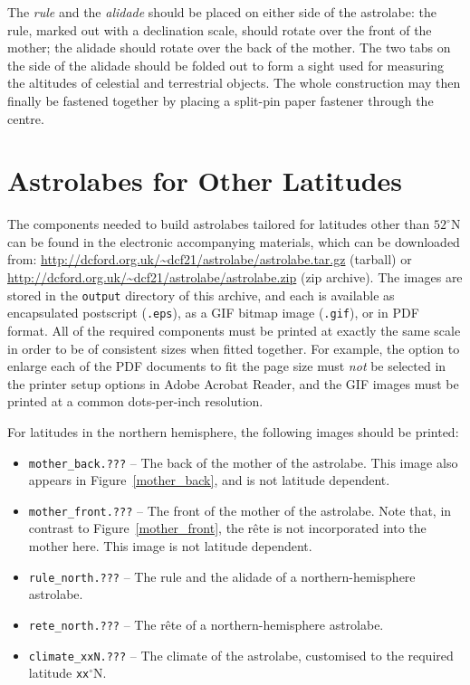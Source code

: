 \documentclass[a4paper,onecolumn,10pt]{article}
\begin{document}
The {\it rule} and the {\it alidade} should be placed on either side of the
astrolabe: the rule, marked out with a declination scale, should rotate over
the front of the mother; the alidade should rotate over the back of the mother.
The two tabs on the side of the alidade should be folded out to form a sight
used for measuring the altitudes of celestial and terrestrial objects.  The
whole construction may then finally be fastened together by placing a split-pin
paper fastener through the centre.

\section*{Astrolabes for Other Latitudes}

The components needed to build astrolabes tailored for latitudes other than
$52^\circ$N can be found in the electronic accompanying materials, which can be
downloaded from:
\newline\noindent\url{http://dcford.org.uk/~dcf21/astrolabe/astrolabe.tar.gz}
(tarball)
\newline\noindent or
\newline\noindent\url{http://dcford.org.uk/~dcf21/astrolabe/astrolabe.zip} (zip
archive).
\newline\noindent The images are stored in the {\tt output} directory of this
archive, and each is available as encapsulated postscript ({\tt .eps}), as a
GIF bitmap image ({\tt .gif}), or in PDF format.  All of the required
components must be printed at exactly the same scale in order to be of
consistent sizes when fitted together. For example, the option to enlarge each
of the PDF documents to fit the page size must {\it not} be selected in the
printer setup options in Adobe Acrobat Reader, and the GIF images must be
printed at a common dots-per-inch resolution.

For latitudes in the northern hemisphere, the following images should be
printed:
\begin{itemize}
\item {\tt mother\_back.???} -- The back of the mother of the astrolabe. This image also appears in Figure~\ref{mother_back}, and is not latitude dependent.
\item {\tt mother\_front.???} -- The front of the mother of the astrolabe. Note that, in contrast to Figure~\ref{mother_front}, the r\^ete is not incorporated into the mother here. This image is not latitude dependent.
\item {\tt rule\_north.???} -- The rule and the alidade of a northern-hemisphere astrolabe.
\item {\tt rete\_north.???} -- The r\^ete of a northern-hemisphere astrolabe.
\item{\tt climate\_xxN.???} -- The climate of the astrolabe, customised to the required latitude {\tt xx}$^\circ$N.
\end{itemize}
\end{document}
